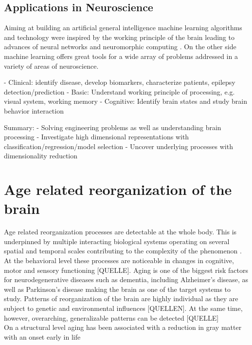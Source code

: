 \subsection{Applications in Neuroscience}
Aiming at building an artificial general intelligence machine learning algorithms and technology were inspired by the working principle of the brain leading to advances of neural networks \cite{Macpherson2021} and neuromorphic computing \cite{Choi2022}. On the other side machine learning offers great tools for a wide array of problems addressed in a variety of areas of neuroscience. 

- Clinical: identify disease, develop biomarkers, characterize patients, epilepsy detection/prediction
- Basic: Understand working principle of processing, e.g. visual system, working memory
- Cognitive: Identify brain states and study brain behavior interaction

Summary: 
- Solving engineering problems as well as understanding brain processing 
- Investigate high dimensional representations with classification/regression/model selection 
- Uncover underlying processes with dimensionality reduction


\section{Age related reorganization of the brain}
Age related reorganization processes are detectable at the whole body. This is underpinned by multiple interacting biological systems operating on several spatial and temporal scales contributing to the complexity of the phenomenon \cite{Mooney2016}. At the behavioral level these processes are noticeable in changes in cognitive, motor and sensory functioning [QUELLE]. Aging is one of the biggest risk factors for neurodegenerative diseases such as dementia, including Alzheimer's disease, as well as Parkinson's disease making the brain as one of the target systems to study. Patterns of reorganization of the brain are highly individual as they are subject to genetic and environmental influences [QUELLEN]. At the same time, however, overarching, generalizable patterns can be detected [QUELLE]\\
On a structural level aging has been associated with a reduction in gray matter with an onset early in life 


\section{}

